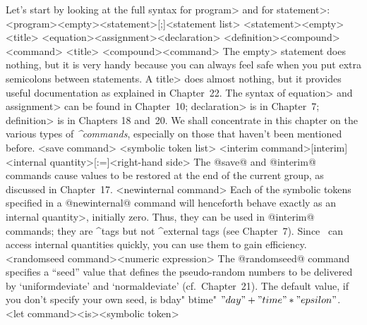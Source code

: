Let's start by looking at the full syntax for \<program> and for
\<statement>:
\beginsyntax
<program>
 \is<empty>\alt<statement>[;]<statement list>
<statement>\is<empty>\alt<title>
 \alt<equation>\alt<assignment>\alt<declaration>
 \alt<definition>\alt<compound>\alt<command>
<title>
<compound>
<command>
\endsyntax
The \<empty> statement does nothing, but it is very handy because you can
always feel safe when you put extra semicolons between statements.
A \<title> does almost nothing, but it provides useful documentation
as explained in Chapter~22.
The syntax of \<equation> and \<assignment> can be found in Chapter~10;
\<declaration> is in Chapter~7; \<definition> is in Chapters 18 and~20.
We shall concentrate in this chapter on the various types of {\sl
^{commands}}, especially on those that haven't been mentioned before.
\beginsyntax
<save command>
<symbolic token list>
<interim command>\is\kern-1.5pt[interim]%
 <internal quantity>[:=]\kern1pt<right-hand side>\kern-1pt
\endsyntax
The @save@ and @interim@ commands cause values to be restored at the end
of the current group, as discussed in Chapter~17.
\beginsyntax
<newinternal command>
\endsyntax
Each of the symbolic tokens specified in a @newinternal@ command will
henceforth behave exactly as an \<internal quantity>, initially zero.
Thus, they can be used in @interim@ commands; they are ^{tags} but not
^{external tags} (see Chapter~7). Since \MF\ can access internal
quantities quickly, you can use them to gain efficiency.
\beginsyntax
<randomseed command>\is[randomseed][:=]\kern1pt<numeric expression>
\endsyntax
The @randomseed@ command specifies a ``seed'' value that defines
the pseudo-random numbers to be delivered by
`uniformdeviate' and `normaldeviate' (cf.~Chapter~21).
The default value, if you don't specify your own seed, is
^^"day" ^^"time" $"day"+"time"\ast"epsilon"$.
\beginsyntax
<let command><is><symbolic token>
